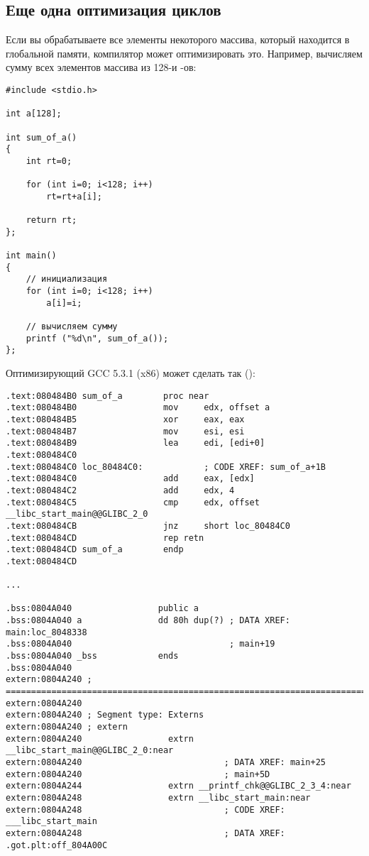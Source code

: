 \subsection{Еще одна оптимизация циклов}

Если вы обрабатываете все элементы некоторого массива, который находится в глобальной памяти, компилятор может оптимизировать
это.
Например, вычисляем сумму всех элементов массива из 128-и -ов:

\begin{lstlisting}[style=customc]
#include <stdio.h>

int a[128];

int sum_of_a()
{
	int rt=0;
	
	for (int i=0; i<128; i++)
		rt=rt+a[i];

	return rt;
};

int main()
{
	// инициализация
	for (int i=0; i<128; i++)
		a[i]=i;
	
	// вычисляем сумму
	printf ("%d\n", sum_of_a());
};
\end{lstlisting}

Оптимизирующий GCC 5.3.1 (x86) может сделать так (\IDA):

\begin{lstlisting}[style=customasmx86]
.text:080484B0 sum_of_a        proc near
.text:080484B0                 mov     edx, offset a
.text:080484B5                 xor     eax, eax
.text:080484B7                 mov     esi, esi
.text:080484B9                 lea     edi, [edi+0]
.text:080484C0
.text:080484C0 loc_80484C0:            ; CODE XREF: sum_of_a+1B
.text:080484C0                 add     eax, [edx]
.text:080484C2                 add     edx, 4
.text:080484C5                 cmp     edx, offset __libc_start_main@@GLIBC_2_0
.text:080484CB                 jnz     short loc_80484C0
.text:080484CD                 rep retn
.text:080484CD sum_of_a        endp
.text:080484CD

...

.bss:0804A040                 public a
.bss:0804A040 a               dd 80h dup(?) ; DATA XREF: main:loc_8048338
.bss:0804A040                               ; main+19
.bss:0804A040 _bss            ends
.bss:0804A040
extern:0804A240 ; ===========================================================================
extern:0804A240
extern:0804A240 ; Segment type: Externs
extern:0804A240 ; extern
extern:0804A240                 extrn __libc_start_main@@GLIBC_2_0:near
extern:0804A240                            ; DATA XREF: main+25
extern:0804A240                            ; main+5D
extern:0804A244                 extrn __printf_chk@@GLIBC_2_3_4:near
extern:0804A248                 extrn __libc_start_main:near
extern:0804A248                            ; CODE XREF: ___libc_start_main
extern:0804A248                            ; DATA XREF: .got.plt:off_804A00C
\end{lstlisting}

